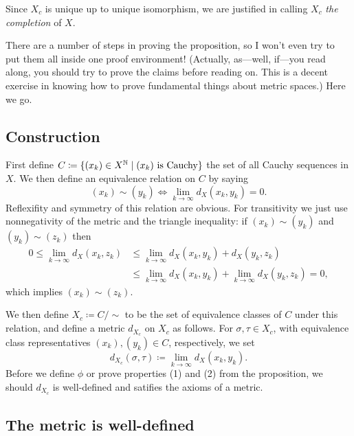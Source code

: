 \begin{definition}
  Since $X_c$ is unique up to unique isomorphism, we are justified in
  calling $X_c$ \textit{the completion} of $X$.
\end{definition}

There are a number of steps in proving the proposition, so I won't
even try to put them all inside one proof environment! (Actually,
as---well, if---you read along, you should try to prove the claims
before reading on. This is a decent exercise in knowing how to prove
fundamental things about metric spaces.) Here we go.


\subsection{Construction}

First define $C \coloneqq \{(x_k) \in X^{\mathbb{N}} \mid (x_k)\text{ is
  Cauchy}\}$ the set of all Cauchy sequences in $X$. We then define an
equivalence relation on $C$ by saying
\[
(x_k) \sim (y_k) \iff \lim_{k \to \infty} d_X(x_k,y_k) = 0.
\]
Reflexifity and symmetry of this relation are obvious. For
transitivity we just use nonnegativity of the metric and the triangle
inequality: if $(x_k) \sim (y_k)$ and $(y_k) \sim (z_k)$ then
\begin{align*}
0 \le \lim_{k \to \infty} d_X(x_k,z_k) &\le \lim_{k \to \infty}
d_X(x_k,y_k) + d_X(y_k,z_k) \\ &\le \lim_{k \to \infty} d_X(x_k,y_k) +
\lim_{k \to \infty} d_X(y_k,z_k) = 0,
\end{align*}
which implies $(x_k) \sim (z_k)$.

We then define $X_c \coloneqq C/{\sim}$ to be the set of equivalence
classes of $C$ under this relation, and define a metric $d_{X_c}$ on
$X_c$ as follows. For $\sigma, \tau \in X_c$, with equivalence class
representatives $(x_k), (y_k) \in C$, respectively, we set
\[
d_{X_c}(\sigma, \tau) \coloneqq \lim_{k \to \infty} d_X(x_k, y_k).
\]
Before we define $\phi$ or prove properties (1) and (2) from the
proposition, we should $d_{X_c}$ is well-defined and satifies the
axioms of a metric.


\subsection{The metric is well-defined}

